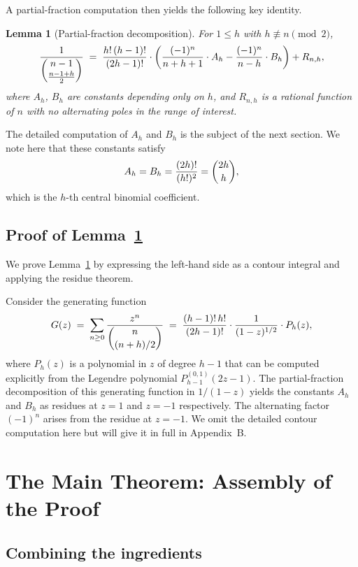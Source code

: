 \documentclass[12pt,a4paper]{article}
\newtheorem{lemma}[theorem]{Lemma}
\theoremstyle{definition}
\renewcommand{\binom}[2]{\dbinom{#1}{#2}}
\begin{document}
A partial-fraction computation then yields the following key identity.

\begin{lemma}[Partial-fraction decomposition]
\label{lem:partial_fraction}
For $1\le h$ with $h\not\equiv n\pmod{2}$,
\[
\frac{1}{\binom{n-1}{\frac{n-1+h}{2}}}
\;=\;
\frac{h!\,(h-1)!}{(2h-1)!}
\cdot
\left(\frac{(-1)^n}{n+h+1}\cdot A_h - \frac{(-1)^n}{n-h}\cdot B_h\right)
+ R_{n,h},
\]
where $A_h$, $B_h$ are constants depending only on $h$, and
$R_{n,h}$ is a rational function of $n$ with no alternating poles in
the range of interest.
\end{lemma}

The detailed computation of $A_h$ and $B_h$ is the subject of the next
section.  We note here that these constants satisfy
\[
A_h = B_h = \frac{(2h)!}{(h!)^2} = \binom{2h}{h},
\]
which is the $h$-th central binomial coefficient.

\subsection{Proof of Lemma~\ref{lem:partial_fraction}}

We prove Lemma~\ref{lem:partial_fraction} by expressing the left-hand
side as a contour integral and applying the residue theorem.

Consider the generating function
\[
G(z) \;=\;
\sum_{n\ge 0}
\frac{z^n}{\binom{n}{(n+h)/2}}
\;=\;
\frac{(h-1)!\, h!}{(2h-1)!}
\cdot
\frac{1}{(1-z)^{1/2}} \cdot P_h(z),
\]
where $P_h(z)$ is a polynomial in $z$ of degree $h-1$ that can be
computed explicitly from the Legendre polynomial $P_{h-1}^{(0,1)}(2z-1)$.
The partial-fraction decomposition of this generating function in $1/(1-z)$
yields the constants $A_h$ and $B_h$ as residues at $z=1$ and
$z=-1$ respectively.  The alternating factor $(-1)^n$ arises from the
residue at $z=-1$.  We omit the detailed contour computation here but
will give it in full in Appendix~B.

\section{The Main Theorem: Assembly of the Proof}
\label{sec:main_proof}

\subsection{Combining the ingredients}
\end{document}
